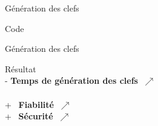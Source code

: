 \begin{frame}{Génération des clefs}
\begin{alertblock}{Code}
    
\end{alertblock}{}
\end{frame}{}

\begin{frame}{Génération des clefs}
 \begin{alertblock}{Résultat}
     \ \\ - \textbf{Temps de génération des clefs} $\ \nearrow $ \\ \\
     + \ \textbf{Fiabilité} $\ \nearrow$ \\
     + \ \textbf{Sécurité} $\ \nearrow$ \\
 \end{alertblock}{}   
\end{frame}{}

